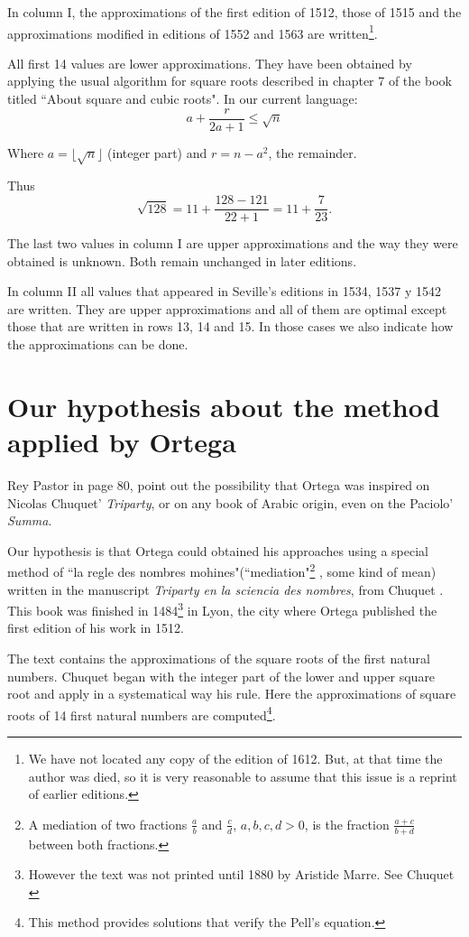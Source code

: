 \documentclass{amsart}
\begin{document}
In column I, the approximations of the first edition of 1512, those of 1515 and the approximations modified in editions of 1552 and 1563 are written\footnote{We have not located any copy of the edition of 1612. But, at that time the author was died, so it is very reasonable to assume that this issue is a reprint of earlier editions.}.

All first 14 values are lower approximations. They have been obtained by applying the usual algorithm for square roots described in chapter 7 of the book titled ``About square and cubic roots". In our current language:
$$a+\frac{r}{2a+1} \leq \sqrt{n}$$

Where  $a=\lfloor \sqrt{n}\rfloor$ (integer part) and $r=n-a^2$, the remainder.

Thus $$\sqrt{128}=11+\frac{128-121}{22+1}=11+\frac{7}{23}.$$

The last two values in column I are upper approximations and the way they were obtained is unknown. Both remain unchanged in later editions.

In column II all values that appeared in Seville's editions in 1534, 1537 y 1542 are written. They are upper approximations and all of them are optimal except those that are written in rows 13, 14 and 15. In those cases we also indicate how the approximations can be done.

\section{Our hypothesis about the method  applied by Ortega}

Rey Pastor in \cite{rey2} page 80, point out the possibility that Ortega was inspired on Nicolas Chuquet' \textit{Triparty}, or on any book of Arabic origin, even on the Paciolo' \textit{Summa}.

Our hypothesis is that Ortega could obtained his approaches using a special method of ``la regle des nombres mohines"(``mediation"\footnote{A mediation of two fractions $\frac{a}{b}$ and $\frac{c}{d}$, $a,b,c,d >0$, is the  fraction $\frac{a+c}{b+d}$ between both fractions.} , some kind of mean) written in the manuscript \textit {Triparty en la sciencia des nombres}, from  Chuquet \cite{chu}. This book was finished in 1484\footnote{ However the text was not  printed until 1880 by Aristide Marre. See Chuquet \cite{chu1}} in Lyon, the city where Ortega published the first edition of his work in 1512.

The text contains the approximations of the square roots of the first natural numbers. Chuquet began with the integer part of the lower and upper square root and apply in a systematical way his rule. Here the approximations of square roots of 14 first natural numbers are computed\footnote{This method provides solutions that verify the Pell's equation.}.
\end{document}
